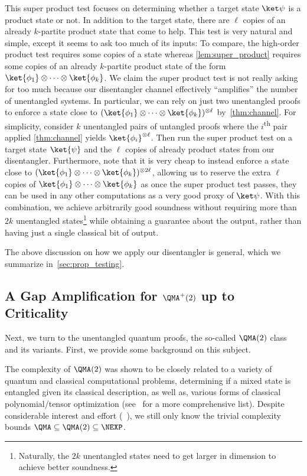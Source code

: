 This super product test focuses on determining whether a target state $\ket\psi$ is a product state or not.
%
In addition to the target state, there are $\ell$ copies of an already $k$-partite product state that come to help.
%
This test is very natural and simple, except it seems to ask too much of its inputs: To compare, the high-order
product test requires some copies of a state whereas \cref{lem:super_product} requires some copies of an already
$k$-partite product state of the form $\ket{\phi_1}\otimes \cdots \otimes \ket{\phi_k}$.
%
We claim the super product test is not really asking for too much because our disentangler channel effectively
``amplifies'' the number of unentangled systems.
%
In particular, we can rely on just two unentangled proofs to enforce a state close to 
$(\ket{\phi_1}\otimes \cdots \otimes \ket{\phi_k})^{\otimes \ell}$ by~\cref{thm:channel}. 
For simplicity, consider $k$ unentangled pairs of untangled proofs where the $i$\textsuperscript{th} pair applied \cref{thm:channel} yields $\ket{\phi_i}^{\otimes \ell}$. 
%
Then run the super product test on a target state $\ket{\psi}$ and the $\ell$ copies
of already product states from our disentangler.
%
Furthermore, note that it is very cheap to instead enforce a state close to
$(\ket{\phi_1}\otimes \cdots \otimes \ket{\phi_k})^{\otimes 2\ell}$, allowing us
to reserve the extra $\ell$ copies of $\ket{\phi_1}\otimes \cdots \otimes \ket{\phi_k}$
as once the super product test passes, they can be used in any other computations as
a very good proxy of $\ket\psi$.
%
With this combination, we achieve arbitrarily good soundness without requiring 
more than $2k$ unentangled states\footnote{Naturally, the $2k$ unentangled states
need to get larger in dimension to achieve better soundness.} while obtaining a
guarantee about the output, rather than having just a single classical bit of output. 

The above discussion on how we apply our disentangler is general, which we summarize in~\cref{sec:prop_testing}.

\subsection{A Gap Amplification for $\QMA^+(2)$ up to Criticality}

Next, we turn to the unentangled quantum proofs, the so-called $\QMA(2)$ class~\cite{KMY03}
and its variants.
%
First, we provide some background on this subject.

The complexity of $\QMA(2)$ was shown to be closely related to a variety
of quantum and classical computational problems, \eg determining if a
mixed state is entangled given its classical description, as well as,
various forms of classical polynomial/tensor optimization
(see~\cite{HM13} for a more comprehensive list).
%
Despite considerable interest and effort (\eg~\cite{DPS04,ABDFS08,BT09,Beigi10,BCY11,GNN12,SW12,P12,BH13,BH15,HNW17}),
we still only know the trivial complexity bounds $\QMA \subseteq \QMA(2) \subseteq \NEXP$.

